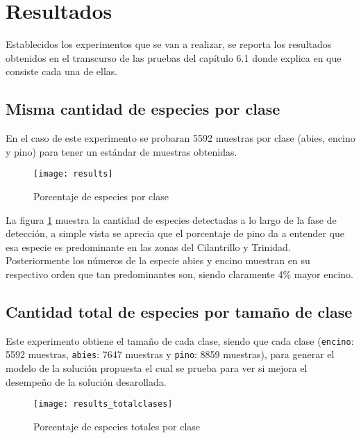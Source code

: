 \newpage

\section{Resultados}
Establecidos los experimentos que se van a realizar, se reporta los resultados obtenidos en el transcurso de las pruebas del capítulo 6.1 donde explica en que consiste cada una de ellas.

\subsection{Misma cantidad de especies por clase}
En el caso de este experimento se probaran 5592 muestras por clase (abies, encino y pino) para tener un estándar de muestras obtenidas.

\begin{figure}[h!]
  \centering  
  \begin{minipage}[b]{0.7\textwidth}
        \texttt{[image: results]}
    \caption{Porcentaje de especies por clase} 
    \label{Porcentaje de especies por clase}
  \end{minipage}
\end{figure}

La figura \ref{Porcentaje de especies por clase} muestra la cantidad de especies detectadas a lo largo de la fase de detección, a simple vista se aprecia que el porcentaje de pino da a entender que esa especie es predominante en las zonas del Cilantrillo y Trinidad. Posteriormente los números de la especie abies y encino muestran en su respectivo orden que tan predominantes son, siendo claramente 4\% mayor encino.

\subsection{Cantidad total de especies por tamaño de clase}
Este experimento obtiene el tamaño de cada clase, siendo que cada clase (\texttt{encino}: 5592 muestras, \texttt{abies}: 7647 muestras y \texttt{pino}: 8859 muestras), para generar el modelo de la solución propuesta el cual se prueba para ver si mejora el desempeño de la solución desarollada.

\begin{figure}[h!]
  \centering  
  \begin{minipage}[b]{0.75\textwidth}
        \texttt{[image: results\_totalclases]}
    \caption{Porcentaje de especies totales por clase} 
    \label{Porcentaje de especies totales por clase}
  \end{minipage}
\end{figure}

